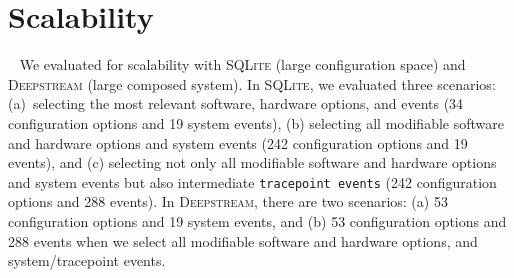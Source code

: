 \section{Scalability}
\label{sec:scalability}


 

~ We evaluated \ourapproach for scalability with \textsc{SQLite} (large configuration space) and \textsc{Deepstream} (large composed system). %
In \textsc{SQLite}, we evaluated three scenarios: (a)~selecting the most relevant software, hardware options, and events (34 configuration options and 19 system events), (b) selecting all modifiable software and hardware options and system events (242 configuration options and 19 events), and (c) selecting not only all modifiable software and hardware options and system events but also intermediate {\tt tracepoint events} (242 configuration options and 288 events). In \textsc{Deepstream}, there are two scenarios: (a) 53 configuration options and 19 system events, and (b) 53 configuration options and 288 events when we select all modifiable software and hardware options, and system/tracepoint events. %


